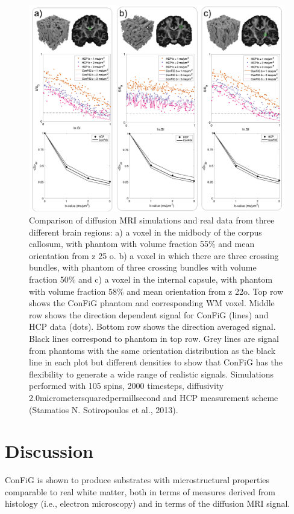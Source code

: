 \begin{figure}
  \centering
  \includegraphics[width=\textwidth]{figures/config/hcp_vs_sim_new_review_2_whitebg.png}
  \caption[dMRI signals from \ac{HCP} subject and \ac{ConFiG} phantoms ]{Comparison of diffusion \ac{MRI} simulations and real data from three different brain regions:  a) a voxel  in the midbody of the corpus callosum, with phantom with volume fraction 55\% and mean orientation from z 25 o. b) a voxel  in which there are three crossing bundles, with phantom of three crossing bundles with volume fraction 50\% and c) a voxel in the internal capsule, with phantom with volume fraction 58\% and mean orientation from z 22o. Top row shows the \ac{ConFiG} phantom and corresponding \ac{WM} voxel. Middle row shows the direction dependent signal for \ac{ConFiG} (lines) and \ac{HCP} data (dots). Bottom row shows the direction averaged signal. Black lines correspond to phantom in top row. Grey lines are signal from phantoms with the same orientation distribution as the black line in each plot but different densities to show that \ac{ConFiG} has the flexibility to generate a wide range of realistic signals. Simulations performed with 105 spins, 2000 timesteps, diffusivity 2.0micrometersquaredpermillsecond  and \ac{HCP} measurement scheme (Stamatios N. Sotiropoulos et al., 2013). }
  \label{fig:config_res_dMRI}
\end{figure}

\section{Discussion}
\label{sec:config_discussion}
ConFiG is shown to produce substrates with microstructural properties comparable to real white matter, both in terms of measures derived from histology (i.e., electron microscopy) and in terms of the diffusion \ac{MRI} signal.

